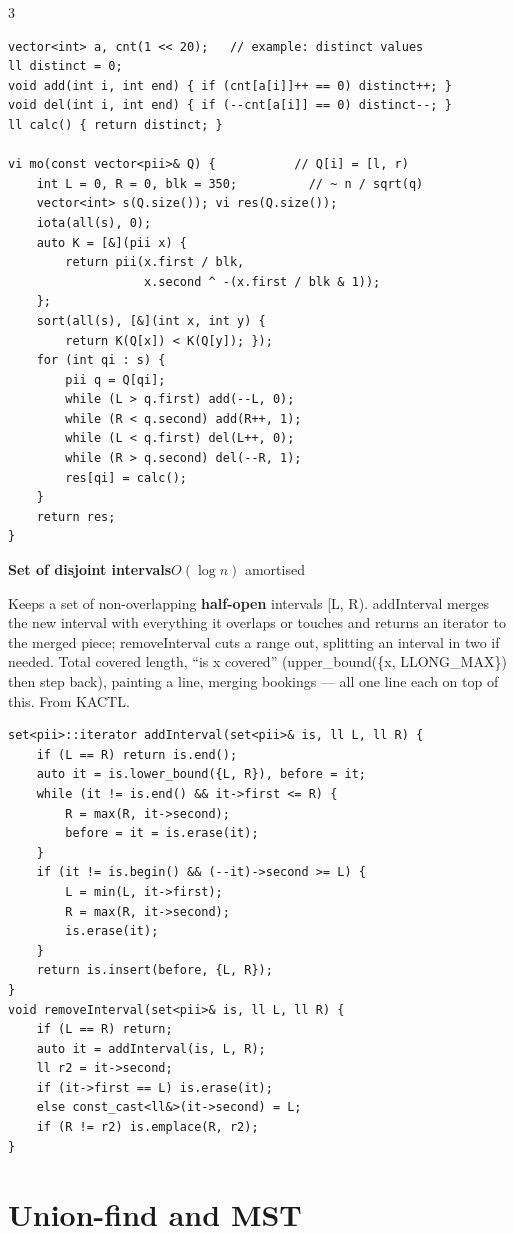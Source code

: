 \documentclass[9pt,a4paper]{extarticle}
\newcommand{\entry}[3]{%
  \addcontentsline{toc}{subsection}{#1}%
  \vspace{0.8ex}%
  \noindent\colorbox{hdbg}{\parbox{\dimexpr\columnwidth-2\fboxsep}{%
    \strut\textbf{#1}\hfill{\footnotesize\textsf{#2}}}}\par
  \vspace{0.4ex}%
  {\footnotesize #3\par}%
}
\newcommand{\code}[1]{{\ttfamily\small #1}}
\begin{document}
\begin{multicols*}{3}
\begin{lstlisting}
vector<int> a, cnt(1 << 20);   // example: distinct values
ll distinct = 0;
void add(int i, int end) { if (cnt[a[i]]++ == 0) distinct++; }
void del(int i, int end) { if (--cnt[a[i]] == 0) distinct--; }
ll calc() { return distinct; }

vi mo(const vector<pii>& Q) {           // Q[i] = [l, r)
    int L = 0, R = 0, blk = 350;          // ~ n / sqrt(q)
    vector<int> s(Q.size()); vi res(Q.size());
    iota(all(s), 0);
    auto K = [&](pii x) {
        return pii(x.first / blk,
                   x.second ^ -(x.first / blk & 1));
    };
    sort(all(s), [&](int x, int y) {
        return K(Q[x]) < K(Q[y]); });
    for (int qi : s) {
        pii q = Q[qi];
        while (L > q.first) add(--L, 0);
        while (R < q.second) add(R++, 1);
        while (L < q.first) del(L++, 0);
        while (R > q.second) del(--R, 1);
        res[qi] = calc();
    }
    return res;
}
\end{lstlisting}

\entry{Set of disjoint intervals}{$O(\log n)$ amortised}{%
Keeps a \code{set} of non-overlapping \textbf{half-open} intervals \code{[L, R)}.
\code{addInterval} merges the new interval with everything it overlaps or touches and
returns an iterator to the merged piece; \code{removeInterval} cuts a range out,
splitting an interval in two if needed. Total covered length, ``is \code{x} covered''
(\code{upper\_bound(\{x, LLONG\_MAX\})} then step back), painting a line, merging
bookings --- all one line each on top of this. From KACTL.}

\begin{lstlisting}
set<pii>::iterator addInterval(set<pii>& is, ll L, ll R) {
    if (L == R) return is.end();
    auto it = is.lower_bound({L, R}), before = it;
    while (it != is.end() && it->first <= R) {
        R = max(R, it->second);
        before = it = is.erase(it);
    }
    if (it != is.begin() && (--it)->second >= L) {
        L = min(L, it->first);
        R = max(R, it->second);
        is.erase(it);
    }
    return is.insert(before, {L, R});
}
void removeInterval(set<pii>& is, ll L, ll R) {
    if (L == R) return;
    auto it = addInterval(is, L, R);
    ll r2 = it->second;
    if (it->first == L) is.erase(it);
    else const_cast<ll&>(it->second) = L;
    if (R != r2) is.emplace(R, r2);
}
\end{lstlisting}

\section{Union-find and MST}


\end{multicols*}
\end{document}
